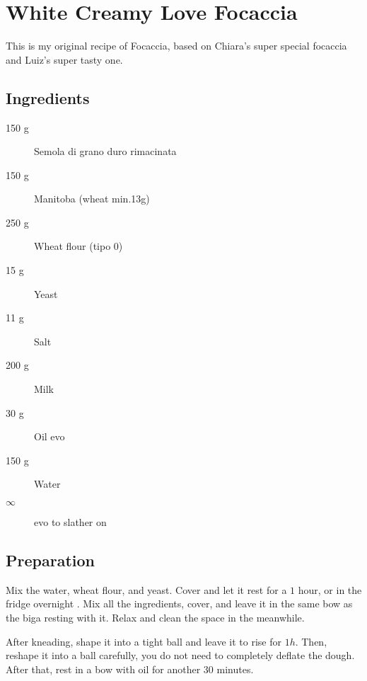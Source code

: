 \setchapterpreamble[u]{\margintoc}
\chapter{White Creamy Love Focaccia}

This is my original recipe of Focaccia, based on Chiara's super special focaccia and Luiz's super tasty one.

\section{Ingredients}

\begin{multicols}{2}
\begin{description}
	\item[150 g] Semola di grano duro rimacinata
	\item[150 g] Manitoba (wheat min.13g)
	\item[250 g] Wheat flour (tipo 0)
	
	\item[15 g] Yeast
	\item[11 g] Salt
	\item[200 g] Milk
	\item[30 g] Oil \gls{evo}
	
	
	\item[150 g] Water
	\item[$\infty$] \gls{evo} to slather on
\end{description}
\end{multicols}	

\section{Preparation}
Mix the water, wheat flour, and yeast.
%
Cover and let it rest for a $1$ hour, or in the fridge overnight .
%
Mix all the ingredients, cover, and leave it in the same bow as the biga resting with it.
%
Relax and clean the space in the meanwhile.

After kneading, shape it into a tight ball and leave it to rise for $1h$.
%
Then, reshape it into a ball carefully, you do not need to completely deflate the dough.
%
After that, rest in a bow with oil for another $30$ minutes.

